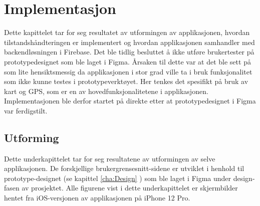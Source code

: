 \chapter{Implementasjon}
Dette kapittelet tar for seg resultatet av utformingen av applikasjonen, hvordan tilstandshåndteringen er implementert og hvordan applikasjonen samhandler med backendløsningen i Firebase. Det ble tidlig besluttet å ikke utføre brukertester på prototypedesignet som ble laget i Figma. Årsaken til dette var at det ble sett på som lite hensiktsmessig da applikasjonen i stor grad ville ta i bruk funksjonalitet som ikke kunne testes i prototypeverktøyet. Her tenkes det spesifikt på bruk av kart og GPS, som er en av hovedfunksjonalitetene i applikasjonen. Implementasjonen ble derfor startet på direkte etter at prototypedesignet i Figma var ferdigstilt.

\section{Utforming}
Dette underkapittelet tar for seg resultatene av utformingen av selve applikasjonen. De forskjellige brukergrensesnitt-sidene er utviklet i henhold til prototype-designet (se kapittel \ref{cha:Design} ) som ble laget i Figma under design-fasen av prosjektet. Alle figurene vist i dette underkapittelet er skjermbilder hentet fra iOS-versjonen av applikasjonen på iPhone 12 Pro. 

